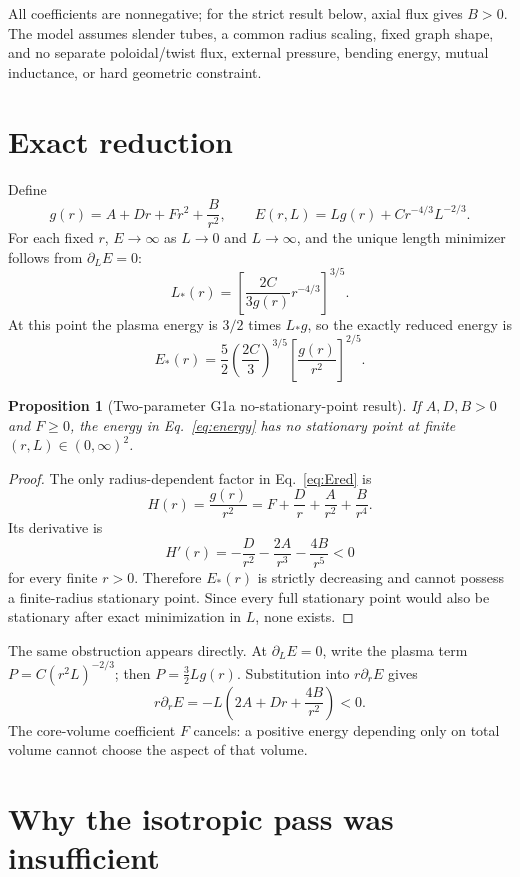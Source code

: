 \documentclass[11pt]{article}
\newtheorem{prop}{Proposition}
\begin{document}
All coefficients are nonnegative; for the strict result below, axial flux gives
$B>0$. The model assumes slender tubes, a common radius scaling, fixed graph shape,
and no separate poloidal/twist flux, external pressure, bending energy, mutual
inductance, or hard geometric constraint.

\section{Exact reduction}

Define
\[
g(r)=A+Dr+Fr^2+\frac{B}{r^2},
\qquad
E(r,L)=Lg(r)+Cr^{-4/3}L^{-2/3}.
\]
For each fixed $r$, $E\to\infty$ as $L\to0$ and $L\to\infty$, and the unique
length minimizer follows from $\partial_LE=0$:
\begin{equation}
L_*(r)=
\left[
\frac{2C}{3g(r)}r^{-4/3}
\right]^{3/5}.
\label{eq:Lstar}
\end{equation}
At this point the plasma energy is $3/2$ times $L_*g$, so the exactly reduced energy
is
\begin{equation}
E_*(r)=\frac52\left(\frac{2C}{3}\right)^{3/5}
\left[\frac{g(r)}{r^2}\right]^{2/5}.
\label{eq:Ered}
\end{equation}

\begin{prop}[Two-parameter G1a no-stationary-point result]
If $A,D,B>0$ and $F\ge0$, the energy in Eq.~\eqref{eq:energy} has no stationary
point at finite $(r,L)\in(0,\infty)^2$.
\end{prop}

\begin{proof}
The only radius-dependent factor in Eq.~\eqref{eq:Ered} is
\[
H(r)=\frac{g(r)}{r^2}
=F+\frac{D}{r}+\frac{A}{r^2}+\frac{B}{r^4}.
\]
Its derivative is
\[
H'(r)=-\frac{D}{r^2}-\frac{2A}{r^3}-\frac{4B}{r^5}<0
\]
for every finite $r>0$. Therefore $E_*(r)$ is strictly decreasing and cannot
possess a finite-radius stationary point. Since every full stationary point would
also be stationary after exact minimization in $L$, none exists.
\end{proof}

The same obstruction appears directly. At $\partial_LE=0$, write the plasma term
$P=C(r^2L)^{-2/3}$; then $P=\tfrac32Lg(r)$. Substitution into
$r\partial_rE$ gives
\[
r\partial_rE
=-L\left(2A+Dr+\frac{4B}{r^2}\right)<0.
\]
The core-volume coefficient $F$ cancels: a positive energy depending only on total
volume cannot choose the aspect of that volume.

\section{Why the isotropic pass was insufficient}
\end{document}
